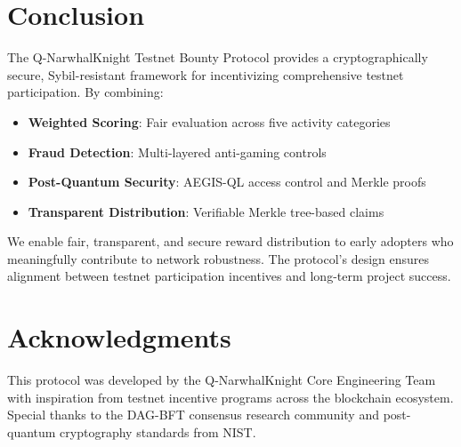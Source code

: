 \documentclass[11pt,a4paper]{article}
\begin{document}
\section{Conclusion}

The Q-NarwhalKnight Testnet Bounty Protocol provides a cryptographically secure, Sybil-resistant framework for incentivizing comprehensive testnet participation. By combining:

\begin{itemize}
    \item \textbf{Weighted Scoring}: Fair evaluation across five activity categories
    \item \textbf{Fraud Detection}: Multi-layered anti-gaming controls
    \item \textbf{Post-Quantum Security}: AEGIS-QL access control and Merkle proofs
    \item \textbf{Transparent Distribution}: Verifiable Merkle tree-based claims
\end{itemize}

We enable fair, transparent, and secure reward distribution to early adopters who meaningfully contribute to network robustness. The protocol's design ensures alignment between testnet participation incentives and long-term project success.

\section*{Acknowledgments}

This protocol was developed by the Q-NarwhalKnight Core Engineering Team with inspiration from testnet incentive programs across the blockchain ecosystem. Special thanks to the DAG-BFT consensus research community and post-quantum cryptography standards from NIST.
\end{document}
